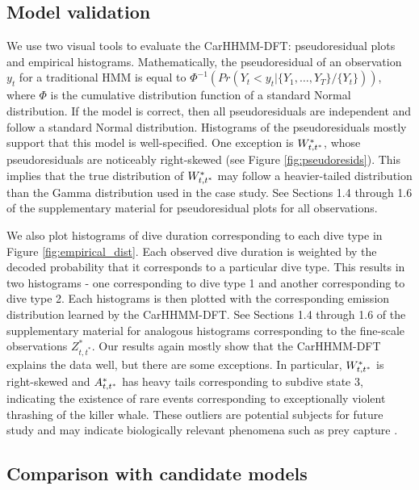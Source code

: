 \subsection{Model validation}
\label{subsec:model_validation}

We use two visual tools to evaluate the CarHHMM-DFT: pseudoresidual plots and empirical histograms. Mathematically, the pseudoresidual of an observation $y_t$ for a traditional HMM is equal to $\Phi^{-1} \left(Pr(Y_t < y_t|\{Y_1,\ldots,Y_T\}/\{Y_t\}) \right)$, where $\Phi$ is the cumulative distribution function of a standard Normal distribution. If the model is correct, then all pseudoresiduals are independent and follow a standard Normal distribution. Histograms of the pseudoresiduals mostly support that this model is well-specified. One exception is $W^*_{t,t^*}$, whose pseudoresiduals are noticeably right-skewed (see Figure \ref{fig:pseudoresids}). This implies that the true distribution of $W^*_{t,t^*}$ may follow a heavier-tailed distribution than the Gamma distribution used in the case study. See Sections 1.4 through 1.6 of the supplementary material for pseudoresidual plots for all observations.

We also plot histograms of dive duration corresponding to each dive type in Figure \ref{fig:empirical_dist}. Each observed dive duration is weighted by the decoded probability that it corresponds to a particular dive type. This results in two histograms - one corresponding to dive type 1 and another corresponding to dive type 2. Each histograms is then plotted with the corresponding emission distribution learned by the CarHHMM-DFT. See Sections 1.4 through 1.6 of the supplementary material for analogous histograms corresponding to the fine-scale observations $Z^*_{t,t^*}$. Our results again mostly show that the CarHHMM-DFT explains the data well, but there are some exceptions. In particular, $W^*_{t,t^*}$ is right-skewed and $A^*_{t,t^*}$ has heavy tails corresponding to subdive state 3, indicating the existence of rare events corresponding to exceptionally violent thrashing of the killer whale. These outliers are potential subjects for future study and may indicate biologically relevant phenomena such as prey capture \citep{Tennessen:2019a}.

\subsection{Comparison with candidate models}

